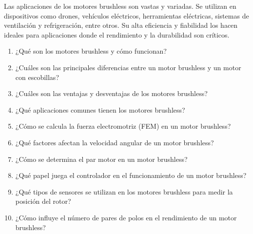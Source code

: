 \documentclass[../main]{subfiles}
\begin{document}
Las aplicaciones de los motores brushless son vastas y variadas. Se utilizan en dispositivos como drones, vehículos eléctricos, herramientas eléctricas, sistemas de ventilación y refrigeración, entre otros. Su alta eficiencia y fiabilidad los hacen ideales para aplicaciones donde el rendimiento y la durabilidad son críticos.


\begin{enumerate}
    \item ¿Qué son los motores brushless y cómo funcionan?
    \item ¿Cuáles son las principales diferencias entre un motor brushless y un motor con escobillas?
    \item ¿Cuáles son las ventajas y desventajas de los motores brushless?
    \item ¿Qué aplicaciones comunes tienen los motores brushless?
    \item ¿Cómo se calcula la fuerza electromotriz (FEM) en un motor brushless?
    \item ¿Qué factores afectan la velocidad angular de un motor brushless?
    \item ¿Cómo se determina el par motor en un motor brushless?
    \item ¿Qué papel juega el controlador en el funcionamiento de un motor brushless?
    \item ¿Qué tipos de sensores se utilizan en los motores brushless para medir la posición del rotor?
    \item ¿Cómo influye el número de pares de polos en el rendimiento de un motor brushless?
\end{enumerate}

\end{document}
